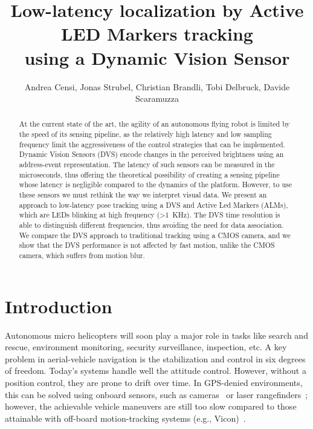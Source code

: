 
\title{\LARGE\bf Low-latency localization by Active LED Markers tracking
\\
using a Dynamic Vision Sensor}


\author{Andrea Censi\mythanks, Jonas Strubel, Christian Brandli, Tobi Delbruck,
Davide Scaramuzza}
\maketitle
\begin{abstract}
At the current state of the art, the agility of an autonomous flying
robot is limited by the speed of its sensing pipeline, as the relatively
high latency and low sampling frequency limit the aggressiveness of
the control strategies that can be implemented. Dynamic Vision Sensors
(DVS) encode changes in the perceived brightness using an address-event
representation. The latency of such sensors can be measured in the
microseconds, thus offering the theoretical possibility of creating
a sensing pipeline whose latency is negligible compared to the dynamics
of the platform. However, to use these sensors we must rethink the
way we interpret visual data. We present an approach to low-latency
pose tracking using a DVS and Active Led Markers (ALMs), which are
LEDs blinking at high frequency (>1~KHz). The DVS time resolution
is able to distinguish different frequencies, thus avoiding the need
for data association. We compare the DVS approach to traditional tracking
using a CMOS camera, and we show that the DVS performance is not affected
by fast motion, unlike the CMOS camera, which suffers from motion
blur. 
\end{abstract}

\section{Introduction}

Autonomous micro helicopters will soon play a major role in tasks
like search and rescue, environment monitoring, security surveillance,
inspection, etc. A key problem in aerial-vehicle navigation is the
stabilization and control in six degrees of freedom. Today's systems
handle well the attitude control. However, without a position control,
they are prone to drift over time. In GPS-denied environments, this
can be solved using onboard sensors, such as cameras~\cite{Weiss2011}
or laser rangefinders~\cite{Shen2011}; however, the achievable vehicle
maneuvers are still too slow compared to those attainable with off-board
motion-tracking systems (e.g., Vicon)~\cite{Lupashin2012}.

